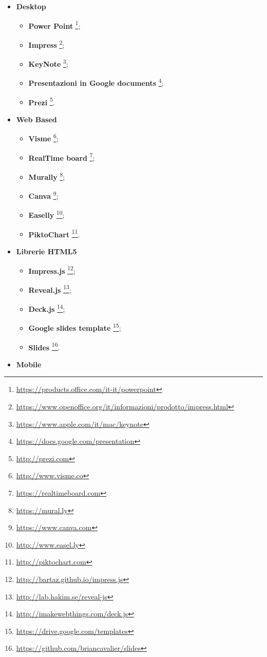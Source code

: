 \begin{itemize}
	\item \textbf{Desktop}
  	\begin{itemize}
  		\item \textbf{Power Point}
  		\footnote{\url{https://products.office.com/it-it/powerpoint}};
  		\item \textbf{Impress}
  		\footnote{\url{https://www.openoffice.org/it/informazioni/prodotto/impress.html}};
  		\item \textbf{KeyNote}
  		\footnote{\url{https://www.apple.com/it/mac/keynote}};
  		\item \textbf{Presentazioni in Google documents}
  		\footnote{\url{https://docs.google.com/presentation}};
  		\item \textbf{Prezi}
  		\footnote{\url{http://prezi.com}}.
  	\end{itemize}
  	\item \textbf{Web Based}
  	\begin{itemize}
  		\item \textbf{Visme}
  		\footnote{\url{http://www.visme.co}};
  		\item \textbf{RealTime board}
  		\footnote{\url{https://realtimeboard.com}};
  		\item \textbf{Murally}
  		\footnote{\url{https://mural.ly}};
  		\item \textbf{Canva}
  		\footnote{\url{https://www.canva.com}};
  		\item \textbf{Easelly}
  		\footnote{\url{http://www.easel.ly}};
  		\item \textbf{PiktoChart}
  		\footnote{\url{http://piktochart.com}}.
  	\end{itemize}
  	  	\item \textbf{Librerie \gls{HTML5}}
  	\begin{itemize}
  		\item \textbf{Impress.js}
  		\footnote{\url{http://bartaz.github.io/impress.js}};
  		\item \textbf{\gls{Reveal.js}}
  		\footnote{\url{http://lab.hakim.se/reveal-js}};
  		\item \textbf{Deck.js}
  		\footnote{\url{http://imakewebthings.com/deck.js}};
  		\item \textbf{Google slides \gls{template}}
  		\footnote{\url{https://drive.google.com/templates}};
  		\item \textbf{Slides}
  		\footnote{\url{https://github.com/briancavalier/slides}}.
  	\end{itemize}
  	  	\item \textbf{Mobile}

\end{itemize}
